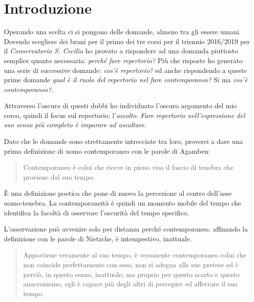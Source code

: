 

\chapter*{Introduzione}

Operando una scelta ci si pongono delle domande, almeno tra gli essere umani. Dovendo scegliere dei brani per il primo dei tre corsi per il triennio 2016/2019 per il \emph{Conservatorio S. Cecilia} ho provato a rispondere ad una domanda piuttosto semplice quanto necessaria: \emph{perché fare repertorio?} Più che risposte ho generato una serie di successive domande: \emph{cos'è repertorio?} ed anche rispondendo a queste prime domande \emph{qual è il ruolo del repertorio nel fare contemporaneo?} Si ma \emph{cos'è contemporaneo?}.

Attraverso l'oscuro di questi dubbi ho individuato l'oscuro argomento del mio corso, quindi il focus sul repertorio: l'\emph{ascolto}. \emph{Fare repertorio nell'espressione del suo senso pi\`u completo \`e imparare ad ascoltare.}

Dato che le domande sono strettamente intrecciate tra loro, proverei a dare una prima definizione di uomo contemporaneo con le parole di Agamben:

\begin{quote}
	Contemporaneo è colui che riceve in pieno viso il fascio di tenebra che proviene dal suo tempo.
\end{quote}

È una definizione poetica che pone di nuovo la percezione al centro dell'asse uomo-tenebra. La contemporaneità è quindi un momento mobile del tempo che identifica la facoltà di osservare l'oscurità del tempo specifico.

L'osservazione può avvenire solo per distanza perché contemporaneo, affinando la definizione con le parole di Nietzche, è intempestivo, inattuale.

\begin{quote}
	Appartiene veramente al suo tempo, è veramente contemporaneo colui che non coincide perfettamente con esso, non si adegua alle sue pretese ed è perciò, in questo senzo, inattuale; ma proprio per questo scarto e questo anacronismo, egli è capace più degli altri di percepire ed afferrare il suo tempo.
\end{quote}

